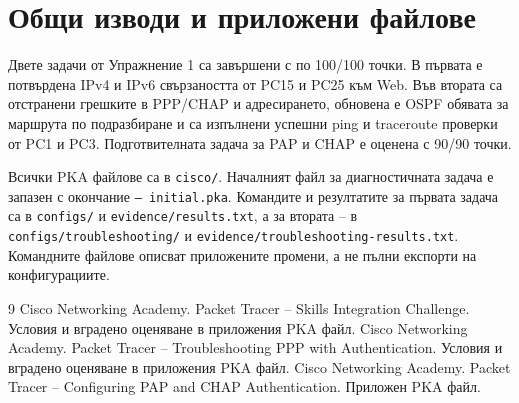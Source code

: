 \documentclass[12pt]{article}
\begin{document}
\section{Общи изводи и приложени файлове}
Двете задачи от Упражнение 1 са завършени с по 100/100 точки. В първата е потвърдена IPv4 и IPv6 свързаността от PC15 и PC25 към Web. Във втората са отстранени грешките в PPP/CHAP и адресирането, обновена е OSPF обявата за маршрута по подразбиране и са изпълнени успешни ping и traceroute проверки от PC1 и PC3. Подготвителната задача за PAP и CHAP е оценена с 90/90 точки.

Всички PKA файлове са в \texttt{cisco/}. Началният файл за диагностичната задача е запазен с окончание \texttt{-- initial.pka}. Командите и резултатите за първата задача са в \texttt{configs/} и \texttt{evidence/results.txt}, а за втората -- в \texttt{configs/troubleshooting/} и \texttt{evidence/troubleshooting-results.txt}. Командните файлове описват приложените промени, а не пълни експорти на конфигурациите.

\begin{thebibliography}{9}
 Cisco Networking Academy. Packet Tracer -- Skills Integration Challenge. Условия и вградено оценяване в приложения PKA файл.
 Cisco Networking Academy. Packet Tracer -- Troubleshooting PPP with Authentication. Условия и вградено оценяване в приложения PKA файл.
 Cisco Networking Academy. Packet Tracer -- Configuring PAP and CHAP Authentication. Приложен PKA файл.
\end{thebibliography}
\end{document}
